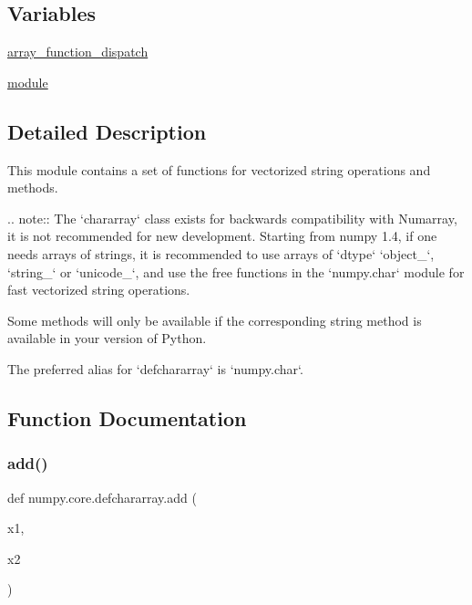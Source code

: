 \subsection*{Variables}
\begin{DoxyCompactItemize}
\item 
\hyperlink{namespacenumpy_1_1core_1_1defchararray_a5a8ca69eff1bb8fd8193d470d49483f2}{array\+\_\+function\+\_\+dispatch}
\item 
\hyperlink{namespacenumpy_1_1core_1_1defchararray_ad3af25f27341b600e3dc91e32c094b0f}{module}
\end{DoxyCompactItemize}


\subsection{Detailed Description}
\begin{DoxyVerb}This module contains a set of functions for vectorized string
operations and methods.

.. note::
   The `chararray` class exists for backwards compatibility with
   Numarray, it is not recommended for new development. Starting from numpy
   1.4, if one needs arrays of strings, it is recommended to use arrays of
   `dtype` `object_`, `string_` or `unicode_`, and use the free functions
   in the `numpy.char` module for fast vectorized string operations.

Some methods will only be available if the corresponding string method is
available in your version of Python.

The preferred alias for `defchararray` is `numpy.char`.\end{DoxyVerb}
 

\subsection{Function Documentation}
\mbox{\label{namespacenumpy_1_1core_1_1defchararray_a04d34947dae1047579629b8f9584c4ce}} 
\subsubsection{\texorpdfstring{add()}{add()}}
{\footnotesize\ttfamily def numpy.\+core.\+defchararray.\+add (\begin{DoxyParamCaption}\item[{}]{x1,  }\item[{}]{x2 }\end{DoxyParamCaption})}

